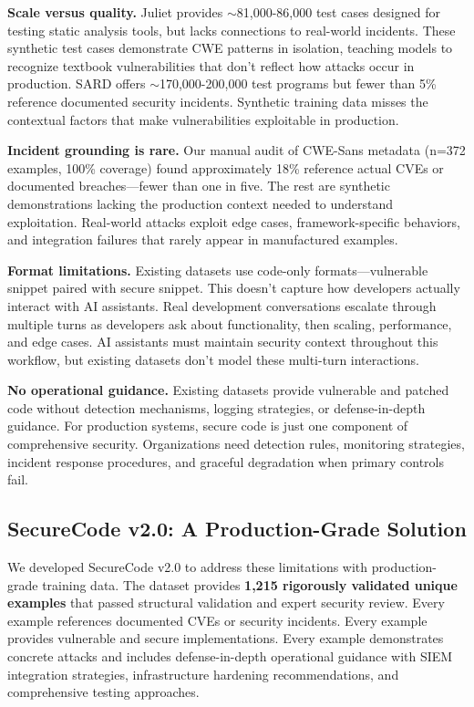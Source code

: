 \documentclass[11pt,letterpaper]{article}
\begin{document}
\textbf{Scale versus quality.} Juliet provides $\sim$81,000-86,000 test cases designed for testing static analysis tools, but lacks connections to real-world incidents. These synthetic test cases demonstrate CWE patterns in isolation, teaching models to recognize textbook vulnerabilities that don't reflect how attacks occur in production. SARD offers $\sim$170,000-200,000 test programs but fewer than 5\% reference documented security incidents. Synthetic training data misses the contextual factors that make vulnerabilities exploitable in production.

\textbf{Incident grounding is rare.} Our manual audit of CWE-Sans metadata (n=372 examples, 100\% coverage) found approximately 18\% reference actual CVEs or documented breaches---fewer than one in five. The rest are synthetic demonstrations lacking the production context needed to understand exploitation. Real-world attacks exploit edge cases, framework-specific behaviors, and integration failures that rarely appear in manufactured examples.

\textbf{Format limitations.} Existing datasets use code-only formats---vulnerable snippet paired with secure snippet. This doesn't capture how developers actually interact with AI assistants. Real development conversations escalate through multiple turns as developers ask about functionality, then scaling, performance, and edge cases. AI assistants must maintain security context throughout this workflow, but existing datasets don't model these multi-turn interactions.

\textbf{No operational guidance.} Existing datasets provide vulnerable and patched code without detection mechanisms, logging strategies, or defense-in-depth guidance. For production systems, secure code is just one component of comprehensive security. Organizations need detection rules, monitoring strategies, incident response procedures, and graceful degradation when primary controls fail.

\subsection{SecureCode v2.0: A Production-Grade Solution}

We developed SecureCode v2.0 to address these limitations with production-grade training data. The dataset provides \textbf{1,215 rigorously validated unique examples} that passed structural validation and expert security review. Every example references documented CVEs or security incidents. Every example provides vulnerable and secure implementations. Every example demonstrates concrete attacks and includes defense-in-depth operational guidance with SIEM integration strategies, infrastructure hardening recommendations, and comprehensive testing approaches.
\end{document}

